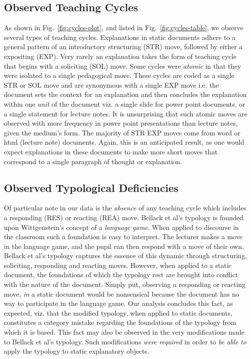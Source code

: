 \documentclass[conference]{IEEEtran}
\begin{document}
\subsection{Observed Teaching Cycles}
As shown in Fig.~\ref{fig:cycles-plot}, and listed in
Fig.~\ref{fig:cycles-table}, we observe several types of teaching cycles.
Explanations in static documents adhere to a general pattern of an introductory
structuring (STR) move, followed by either a expositing (EXP). Very rarely an
explanation takes the form of teaching cycle that begins with a soliciting (SOL)
move. Some cycles were \emph{atomic} in that they were isolated to a single
pedagogical move. These cycles are coded as a single STR or SOL move and are
synonymous with a single EXP move i.e. the document sets the context for an
explanation and then concludes the explanation within one \emph{unit} of the
document viz. a single slide for power point documents, or a single statement
for lecture notes. It is unsurprising that such atomic moves are observed with
more frequency in power point presentations than lecture notes, given the
medium's form. The majority of STR EXP moves come from word or html (lecture
note) documents. Again, this is an anticipated result, as one would expect
explanations in these documents to make more short moves that correspond to a
single paragraph of thought or explanation.

\subsection{Observed Typological Deficiencies}
\label{sec:res:analysis}
Of particular note in our data is the \emph{absence} of any teaching cycle which
includes a responding (RES) or reacting (REA) move. Bellack et al's typology is
founded upon Wittgenstein's concept of a \emph{language game}. When applied to
discourse in the classroom such a foundation is easy to interpret. The lecturer
makes a move in the language game, and the pupil can then respond with a move of
their own. Bellack et al's typology captures the essence of this dynamic through
structuring, soliciting, responding and reacting moves. However, when applied to
a static document, the foundations of which the typology rest are brought into
conflict with the nature of the document. Simply put, observing a responding or
reacting move, \emph{in} a static document would be nonsensical because the
document has no way to participate in the language game. Our analysis concludes
this fact, as expected, viz. that the modified typology, when applied to static
documents, constitutes a category mistake regarding the foundations of the
typology from which it is based. This fact may also be observed in the very
modifications made to Bellack et al's typology. Such modifications \emph{were
  required} in order to \emph{be able to} apply the typology to static
explanatory objects.
\end{document}
